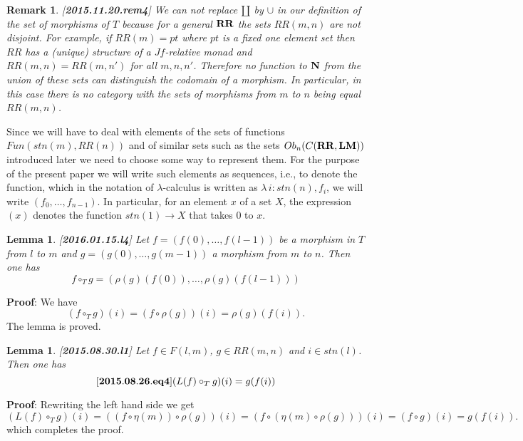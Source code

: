 \documentclass[11pt]{article}
\newenvironment{eq}{\begin{equation}}{\end{equation}}
\newenvironment{proof}{{\bf Proof}:}{\vskip 5mm }
\newtheorem{lemma}[proposition]{Lemma}
\newtheorem{remark}[proposition]{Remark}
\newcommand{\llabel}[1]{\label{#1}[{\bf #1}]}
\newcommand{\comment}[1]{}
\newcommand{\sr}{\rightarrow}
\newcommand{\nn}{{\bf N\rm}}
\newcommand{\nat}{\nn}
\newcommand{\mbind}{\rho}
\newcommand{\hc}{\circ_{T}}
\newcommand{\RR}{{\bf RR}}
\newcommand{\LM}{{\bf LM}}
\begin{document}
\comment{Similarly, we will use the functions $\mbind(m)$ as a coercions so that when an element $g$ of $RR(m,n)$ occurs in a position where a function from $RR(m)$ to $RR(n)$ is expected it has to be replaced by $\mbind(g)$. }
%
\begin{remark}\rm
\llabel{2015.11.20.rem4}
We can not replace $\amalg$ by $\cup$ in our definition of the set of morphisms of $T$ because for a general $\RR$ the sets $RR(m,n)$ are not disjoint.  For example, if $RR(m)=pt$ where $pt$ is a fixed one element set then $RR$ has a (unique) structure of a $Jf$-relative monad and $RR(m,n)=RR(m,n')$ for all $m,n,n'$. Therefore no function to $\nat$ from the union of these sets can distinguish the codomain of a morphism. In particular, in this case there is no category with the sets of morphisms from $m$ to $n$ being equal $RR(m,n)$. 
\end{remark}
%
Since we will have to deal with elements of the sets of functions $Fun(stn(m),RR(n))$ and of similar sets such as the sets $Ob_n(C(\RR,\LM))$ introduced later we need to choose some way to represent them. For the purpose of the present paper we will write such elements as sequences, i.e., to denote the function, which in the notation of $\lambda$-calculus is written as $\lambda\,i:stn(n), f_i$, we will write $(f_0,\dots,f_{n-1})$. In particular, for an element $x$ of a set $X$, the expression $(x)$ denotes the function $stn(1)\sr X$ that takes $0$ to $x$. 
%
\begin{lemma}
\llabel{2016.01.15.l4}
Let $f=(f(0),\dots,f(l-1))$ be a morphism in $T$ from $l$ to $m$ and $g=(g(0),\dots,g(m-1))$ a morphism from $m$ to $n$. Then one has
%
$$f\hc g=(\mbind(g)(f(0)),\dots,\mbind(g)(f(l-1)))$$
%
\end{lemma}
%
\begin{proof}
We have
%
$$(f\hc g)(i)=(f\circ\mbind(g))(i)=\mbind(g)(f(i)).$$
%
The lemma is proved. 
\end{proof}
%
\begin{lemma}
\llabel{2015.08.30.l1}
Let $f\in F(l,m)$, $g\in RR(m,n)$ and $i\in stn(l)$. Then one has
%
\begin{eq}\llabel{2015.08.26.eq4}
(L(f)\hc g)(i)=g(f(i))
\end{eq}
% 
\end{lemma}
%
\begin{proof}
Rewriting the left hand side we get 
%
$$(L(f)\hc g)(i)=((f\circ \eta(m))\circ \mbind(g))(i)=(f\circ (\eta(m)\circ \mbind(g)))(i)=(f\circ g)(i)=g(f(i)).$$
%
which completes the proof. 
\end{proof}
\end{document}
